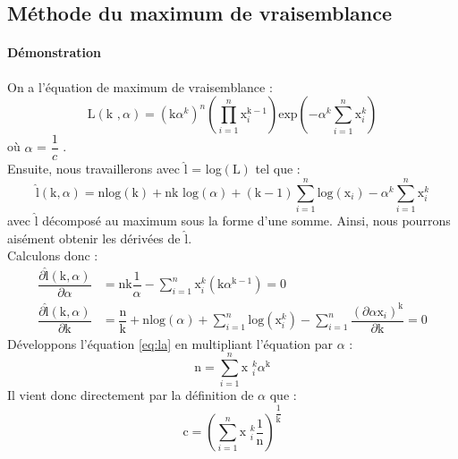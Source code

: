 \subsection{Méthode du maximum de vraisemblance}
\paragraph{Démonstration}
\noindent On a l'équation de maximum de vraisemblance : \\
\begin{equation}
\mbox{L}\left(\mbox{k },\alpha \right) = \left( \mbox{k} \alpha^{k} \right)^{n} \left( \prod\limits_{i=1}^{n} \mbox{x}^{\mbox{k}-1}_{i} \right) \mbox{exp}\left( -\alpha^{k} \sum\limits_{i=1}^n \mbox{x}^{k}_{i}\right)
\end{equation}
où $\alpha$ = $\dfrac{1}{c}$ . \\
Ensuite, nous travaillerons avec $\hat{\mbox{l}}$ = log$\left( \mbox{L} \right)$ tel que : 
\begin{equation}
\hat{\mbox{l}}(\mbox{k},\alpha) = \mbox{nlog}(\mbox{k}) + \mbox{nk log}(\alpha) + (\mbox{k}-1) \sum\limits_{i=1}^{n}\mbox{log}(\mbox{x}_{i}) - \alpha^{k} \sum\limits_{i=1}^{n} \mbox{x}^{k}_{i}
\end{equation}
avec $\hat{\mbox{l}}$ décomposé au maximum sous la forme d'une somme. Ainsi, nous pourrons aisément obtenir  les dérivées de $\hat{\mbox{l}}$. \\
Calculons donc :
\begin{align}
\dfrac{\partial\hat{\mbox{l}}(\mbox{k},\alpha)}{\partial \alpha} &= \mbox{nk} \dfrac{1}{\alpha} - \sum\limits_{i=1}^{n} \mbox{x}^{k}_{i} \left( \mbox{k} \alpha^{\mbox{k}-1} \right) = 0 \label{eq:la} \\ \label{eq:lk}
\dfrac{\partial\hat{\mbox{l}}(\mbox{k},\alpha)}{\partial \mbox{k}} &= \dfrac{\mbox{n}}{\mbox{k}} + \mbox{n}\mbox{log}(\alpha) + \sum\limits_{i=1}^{n} \mbox{log}(\mbox{x}^{k}_{i}) - \sum\limits_{i=1}^{n} \dfrac{(\partial \alpha \mbox{x}_{i})^{\mbox{k}}}{\partial \mbox{k}} = 0
\end{align}
Développons l'équation \ref{eq:la} en multipliant l'équation par $\alpha$ :
\begin{equation}
\mbox{n} = \sum\limits_{i=1}^{n} \mbox{x }^{k}_{i} \alpha^{\mbox{k}} 
\end{equation}
Il vient donc directement par la définition de $\alpha$ que :
\begin{equation}
\mbox{c} = \left(\sum\limits_{i=1}^{n} \mbox{x }^{k}_{i}\dfrac{1}{\mbox{n}}\right)^{\dfrac{1}{\mbox{k}}} \label{c}
\end{equation}
